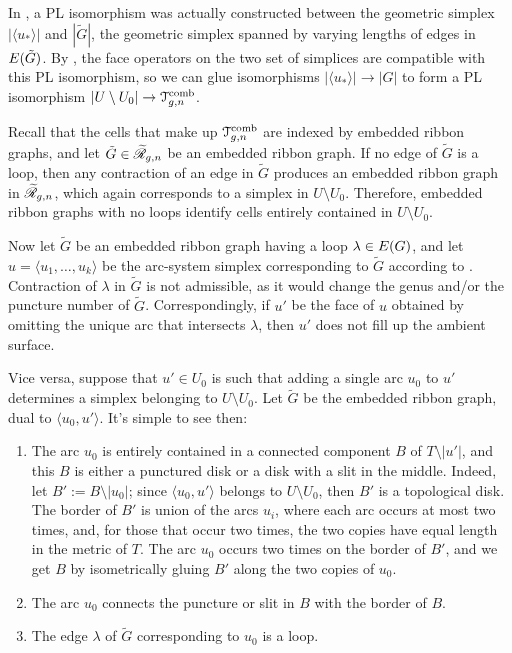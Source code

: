 In , a PL isomorphism was actually constructed
between the geometric simplex $|\langle u_*\rangle|$ and $|{\tilde G}|$, the
geometric simplex spanned by varying lengths of edges in
$\Edges{\tilde G}$.  By , the face
operators on the two set of simplices are compatible with this PL
isomorphism, so we can glue isomorphisms $|\langle u_*\rangle| \to |G|$ to form a PL
isomorphism $|U \setminus U_0| \to \Tcomb_{g,n}$.

Recall that the cells that make up $\Tcomb_{g,n}$ are indexed by
embedded ribbon graphs, and let ${\tilde G} \in \ERG[g,n]$ be an embedded
ribbon graph. If no edge of ${\tilde G}$ is a loop, then any contraction
of an edge in ${\tilde G}$ produces an embedded ribbon graph in
$\ERG[g,n]$, which again corresponds to a simplex in $U \setminus U_0$.
Therefore, embedded ribbon graphs with no loops identify cells
entirely contained in $U \setminus U_0$. 

Now let ${\tilde G}$ be an embedded ribbon graph having a loop $\lambda \in
\Edges{G}$, and let $u = \langle u_1, \ldots, u_k\rangle$ be the arc-system simplex
corresponding to ${\tilde G}$ according to .
Contraction of $\lambda$ in ${\tilde G}$ is not admissible, as it would change
the genus and/or the puncture number of ${\tilde G}$.  Correspondingly,
if $u'$ be the face of $u$ obtained by omitting the unique arc
that intersects $\lambda$, then $u'$ does not fill up the ambient surface.

Vice versa, suppose that $u' \in U_0$ is such that adding a single arc
$u_0$ to $u'$ determines a simplex belonging to $U \setminus U_0$.  Let
${\tilde G}$ be the embedded ribbon graph, dual to $\langle u_0, u'\rangle$.  It's
simple to see then:
\begin{enumerate}
\item The arc $u_0$ is entirely contained in a connected component $B$
  of $T \setminus |u'|$, and this $B$ is either a punctured disk or a disk
  with a slit in the middle.  Indeed, let $B' := B \setminus |u_0|$; since
  $\langle u_0, u'\rangle$ belongs to $U \setminus U_0$, then $B'$ is a topological disk.
  The border of $B'$ is union of the arcs $u_i$, where each arc occurs
  at most two times, and, for those that occur two times, the two
  copies have equal length in the metric of $T$.  The arc $u_0$ occurs
  two times on the border of $B'$, and we get $B$ by isometrically
  gluing $B'$ along the two copies of $u_0$. 
\item The arc $u_0$ connects the puncture or slit in $B$ with the
  border of $B$.
\item The edge $\lambda$ of ${\tilde G}$ corresponding to $u_0$ is a loop.
\end{enumerate}

